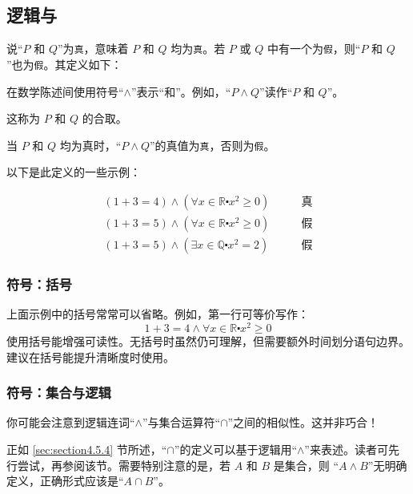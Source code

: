 \subsection{逻辑与}

说``$P$ 和 $Q$''为\verb|真|，意味着 $P$ 和 $Q$ 均为\verb|真|。若 $P$ 或 $Q$ 中有一个为\verb|假|，则``$P$ 和 $Q$''也为\verb|假|。其定义如下：

\begin{definition}
    在数学陈述间使用符号``$\land$''表示``和''。例如，``$P \land Q$''读作``$P$ 和 $Q$''。

    这称为 $P$ 和 $Q$ 的合取。

    当 $P$ 和 $Q$ 均为真时，``$P \land Q$''的真值为\verb|真|，否则为\verb|假|。
\end{definition}

以下是此定义的一些示例：
\begin{example}
    \begin{align*}
        (1 + 3 = 4) \land (\forall x \in \mathbb{R} \centerdot x^2 \ge 0) \qquad &\text{真} \\
        (1 + 3 = 5) \land (\forall x \in \mathbb{R} \centerdot x^2 \ge 0) \qquad &\text{假} \\
        (1 + 3 = 5) \land (\exists x \in \mathbb{Q} \centerdot x^2 = 2)   \qquad &\text{假}
    \end{align*}
\end{example}

\subsubsection*{符号：括号}

上面示例中的括号常常可以省略。例如，第一行可等价写作：
\[1 + 3 = 4 \land \forall x \in \mathbb{R} \centerdot x^2 \ge 0\]
使用括号能增强可读性。无括号时虽然仍可理解，但需要额外时间划分语句边界。建议在括号能提升清晰度时使用。

\subsubsection*{符号：集合与逻辑}

你可能会注意到逻辑连词``$\land$''与集合运算符``$\cap$''之间的相似性。这并非巧合！

正如 \ref{sec:section4.5.4} 节所述，``$\cap$''的定义可以基于逻辑用``$\land$''来表述。读者可先行尝试，再参阅该节。需要特别注意的是，若 $A$ 和 $B$ 是集合，则 ``$A \land B$''无明确定义，正确形式应该是``$A \cap B$''。
